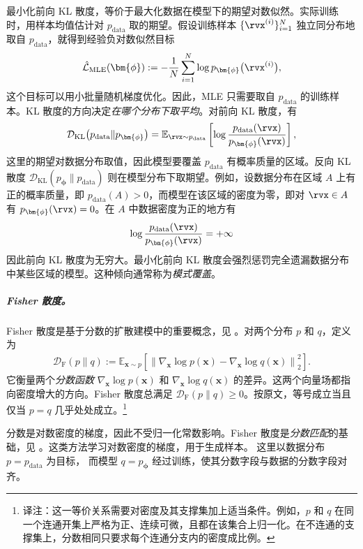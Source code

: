 最小化前向 KL 散度，等价于最大化数据在模型下的期望对数似然。实际训练时，用样本均值估计对 $p_{\mathrm{data}}$ 取的期望。假设训练样本 $\{\rvx^{(i)}\}_{i=1}^{N}$ 独立同分布地取自 $p_{\mathrm{data}}$，就得到经验负对数似然目标
\begin{align*}
\hat{\mathcal{L}}_{\mathrm{MLE}}(\bm{\phi})
:=
-\frac{1}{N}
\sum_{i=1}^{N}
\log p_{\bm{\phi}}\big(\rvx^{(i)}\big),
\end{align*}
这个目标可以用小批量随机梯度优化。因此，MLE 只需要取自 $p_{\mathrm{data}}$ 的训练样本。KL 散度的方向决定\emph{在哪个分布下取平均}。对前向 KL 散度，有
\[
\mathcal{D}_{\mathrm{KL}}
\big(p_{\mathrm{data}}\|p_{\bm{\phi}}\big)
=
\mathbb{E}_{\rvx\sim p_{\mathrm{data}}}
\left[
\log
\frac{p_{\mathrm{data}}(\rvx)}
     {p_{\bm{\phi}}(\rvx)}
\right],
\]
这里的期望对数据分布取值，因此模型要覆盖 $p_{\mathrm{data}}$ 有概率质量的区域。反向 KL 散度 $\mathcal{D}_{\mathrm{KL}}
(p_{\bm{\phi}}\|p_{\mathrm{data}})$ 则在模型分布下取期望。例如，设数据分布在区域 $A$ 上有正的概率质量，即 $p_{\mathrm{data}}(A)>0$，而模型在该区域的密度为零，即对 $\rvx\in A$ 有 $p_{\bm{\phi}}(\rvx)=0$。在 $A$ 中数据密度为正的地方有
\[
\log
\frac{p_{\mathrm{data}}(\rvx)}
     {p_{\bm{\phi}}(\rvx)}
=
+\infty
\]
因此前向 KL 散度为无穷大。最小化前向 KL 散度会强烈惩罚完全遗漏数据分布中某些区域的模型。这种倾向通常称为\emph{模式覆盖}。


\subparagraph{Fisher 散度。} Fisher 散度是基于分数的扩散建模中的重要概念，见 。对两个分布 $p$ 和 $q$，定义为
\begin{align}\label{eq:fisher}
    \mathcal D_{\mathrm F}(p \|  q)
:=
\mathbb{E}_{\mathbf{x}\sim p} \left[
\left\|\nabla_{\mathbf x}\log p(\mathbf x)-\nabla_{\mathbf x}\log q(\mathbf x)\right\|_2^{2}
\right].
\end{align}
它衡量两个\emph{分数函数} $\nabla_{\mathbf x}\log p(\mathbf x)$ 和 $\nabla_{\mathbf x}\log q(\mathbf x)$ 的差异。这两个向量场都指向密度增大的方向。Fisher 散度总满足 $\mathcal D_{\mathrm F}(p \|  q)\ge 0$。按原文，等号成立当且仅当 $p=q$ 几乎处处成立。\footnote{译注：这一等价关系需要对密度及其支撑集加上适当条件。例如，$p$ 和 $q$ 在同一个连通开集上严格为正、连续可微，且都在该集合上归一化。在不连通的支撑集上，分数相同只要求每个连通分支内的密度成比例。}

分数是对数密度的梯度，因此不受归一化常数影响。Fisher 散度是\emph{分数匹配}的基础，见 。这类方法学习对数密度的梯度，用于生成样本。
这里以数据分布 $p=p_{\mathrm{data}}$ 为目标，
而模型 $q=p_{\bm{\phi}}$ 经过训练，使其分数字段与数据的分数字段对齐。


